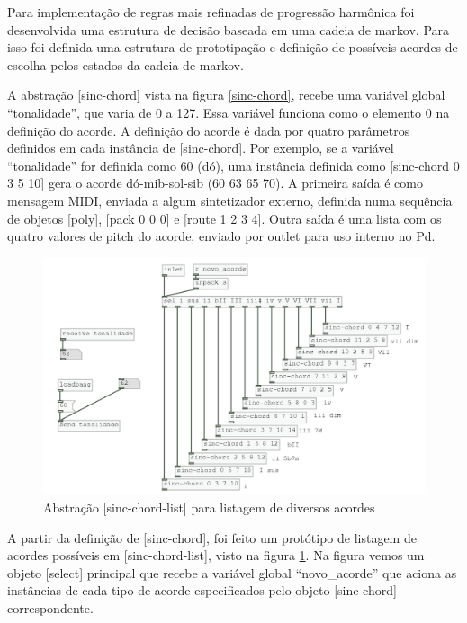 \documentclass{ppgmus}
\begin{document}
Para implementação de regras mais refinadas de progressão harmônica foi desenvolvida uma
estrutura de decisão baseada em uma cadeia de markov. Para isso foi definida uma
estrutura de prototipação e definição de possíveis acordes de escolha pelos estados
da cadeia de markov.

A abstração [sinc-chord] vista na figura \ref{sinc-chord}, recebe uma variável global
``tonalidade'',  que varia de 0 a 127. Essa variável funciona como o elemento 0 na definição
do acorde. A definição do acorde é dada por quatro parâmetros definidos em cada instância
de [sinc-chord]. Por exemplo, se a variável ``tonalidade'' for definida como 60 (dó), uma instância 
definida como [sinc-chord 0 3 5 10] gera o acorde dó-mib-sol-sib (60 63 65 70).
A primeira saída é como mensagem MIDI, enviada a algum sintetizador externo, definida numa sequência
de objetos [poly], [pack 0 0 0] e [route 1 2 3 4]. Outra saída é uma lista com os quatro valores
de pitch do acorde, enviado por outlet para uso interno no Pd.


\begin{figure}
\includegraphics[scale=.7]{sinc-chord-list}
\caption{Abstração [sinc-chord-list] para listagem de diversos acordes}
\label{sinc-chord-list}
\end{figure}


A partir da definição de [sinc-chord], foi feito um protótipo de listagem de acordes
possíveis em [sinc-chord-list], visto na figura \ref{sinc-chord-list}. Na figura vemos
um objeto [select] principal que recebe a variável global ``novo\_acorde'' que aciona as instâncias
de cada tipo de acorde especificados pelo objeto [sinc-chord] correspondente.
\end{document}
